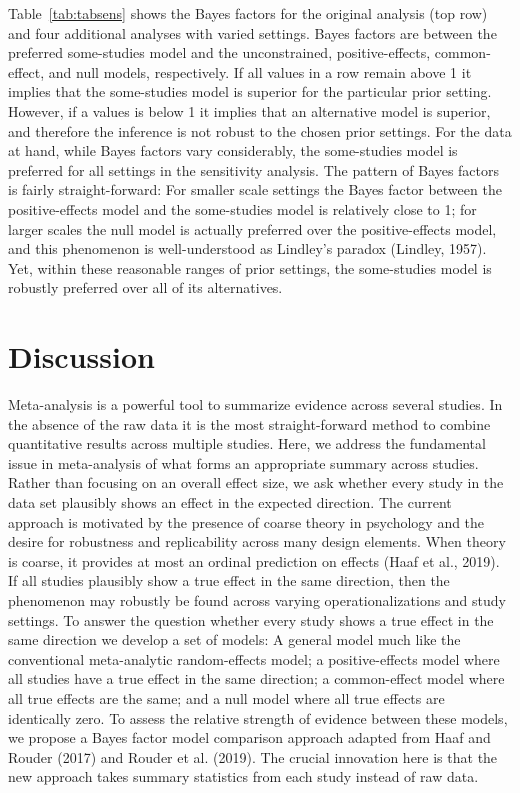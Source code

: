 \documentclass[english,,man]{apa6}
\begin{document}
Table~\ref{tab:tabsens} shows the Bayes factors for the original analysis (top row) and four additional analyses with varied settings. Bayes factors are between the preferred some-studies model and the unconstrained, positive-effects, common-effect, and null models, respectively. If all values in a row remain above 1 it implies that the some-studies model is superior for the particular prior setting. However, if a values is below 1 it implies that an alternative model is superior, and therefore the inference is not robust to the chosen prior settings. For the data at hand, while Bayes factors vary considerably, the some-studies model is preferred for all settings in the sensitivity analysis. The pattern of Bayes factors is fairly straight-forward: For smaller scale settings the Bayes factor between the positive-effects model and the some-studies model is relatively close to 1; for larger scales the null model is actually preferred over the positive-effects model, and this phenomenon is well-understood as Lindley's paradox (Lindley, 1957). Yet, within these reasonable ranges of prior settings, the some-studies model is robustly preferred over all of its alternatives.

\hypertarget{discussion}{%
\section{Discussion}\label{discussion}}

Meta-analysis is a powerful tool to summarize evidence across several studies. In the absence of the raw data it is the most straight-forward method to combine quantitative results across multiple studies. Here, we address the fundamental issue in meta-analysis of what forms an appropriate summary across studies. Rather than focusing on an overall effect size, we ask whether every study in the data set plausibly shows an effect in the expected direction. The current approach is motivated by the presence of coarse theory in psychology and the desire for robustness and replicability across many design elements. When theory is coarse, it provides at most an ordinal prediction on effects (Haaf et al., 2019). If all studies plausibly show a true effect in the same direction, then the phenomenon may robustly be found across varying operationalizations and study settings. To answer the question whether every study shows a true effect in the same direction we develop a set of models: A general model much like the conventional meta-analytic random-effects model; a positive-effects model where all studies have a true effect in the same direction; a common-effect model where all true effects are the same; and a null model where all true effects are identically zero. To assess the relative strength of evidence between these models, we propose a Bayes factor model comparison approach adapted from Haaf and Rouder (2017) and Rouder et al. (2019). The crucial innovation here is that the new approach takes summary statistics from each study instead of raw data.
\end{document}
